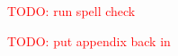 \documentclass[12pt,twoside]{mitthesis}
\newcommand{\TODO}[1]{\textcolor{red}{TODO: #1}}
\begin{document}

\pagestyle{plain}

\TODO{run spell check}








\appendix
\TODO{put appendix back in}
% 
% 
% 
% 
\begin{singlespace}
\printbibliography
\end{singlespace}
\end{document}
